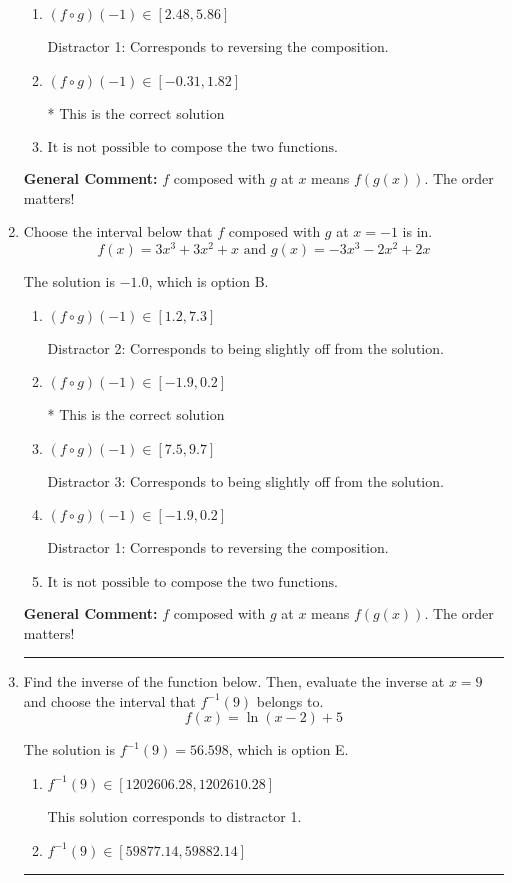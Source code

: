 \documentclass{extbook}[14pt]
\newcommand{\litem}[1]{\item #1

\rule{\textwidth}{0.4pt}}
\begin{document}
\begin{enumerate}
{\begin{enumerate}[label=\Alph*.]
 Distractor 2: Corresponds to being slightly off from the solution.
\item \( (f \circ g)(-1) \in [2.48, 5.86] \)

 Distractor 1: Corresponds to reversing the composition.
\item \( (f \circ g)(-1) \in [-0.31, 1.82] \)

* This is the correct solution
\item \( \text{It is not possible to compose the two functions.} \)


\end{enumerate}

\textbf{General Comment:} $f$ composed with $g$ at $x$ means $f(g(x))$. The order matters!
}
\litem{
Choose the interval below that $f$ composed with $g$ at $x=-1$ is in.
\[ f(x) = 3x^{3} +3 x^{2} +x \text{ and } g(x) = -3x^{3} -2 x^{2} +2 x \]

The solution is \( -1.0 \), which is option B.\begin{enumerate}[label=\Alph*.]
\item \( (f \circ g)(-1) \in [1.2, 7.3] \)

 Distractor 2: Corresponds to being slightly off from the solution.
\item \( (f \circ g)(-1) \in [-1.9, 0.2] \)

* This is the correct solution
\item \( (f \circ g)(-1) \in [7.5, 9.7] \)

 Distractor 3: Corresponds to being slightly off from the solution.
\item \( (f \circ g)(-1) \in [-1.9, 0.2] \)

 Distractor 1: Corresponds to reversing the composition.
\item \( \text{It is not possible to compose the two functions.} \)


\end{enumerate}

\textbf{General Comment:} $f$ composed with $g$ at $x$ means $f(g(x))$. The order matters!
}
\litem{
Find the inverse of the function below. Then, evaluate the inverse at $x = 9$ and choose the interval that $f^{-1}(9)$ belongs to.
\[ f(x) = \ln{(x-2)}+5 \]

The solution is \( f^{-1}(9) = 56.598 \), which is option E.\begin{enumerate}[label=\Alph*.]
\item \( f^{-1}(9) \in [1202606.28, 1202610.28] \)

 This solution corresponds to distractor 1.
\item \( f^{-1}(9) \in [59877.14, 59882.14] \)


\end{enumerate}}
\end{enumerate}
\end{document}
